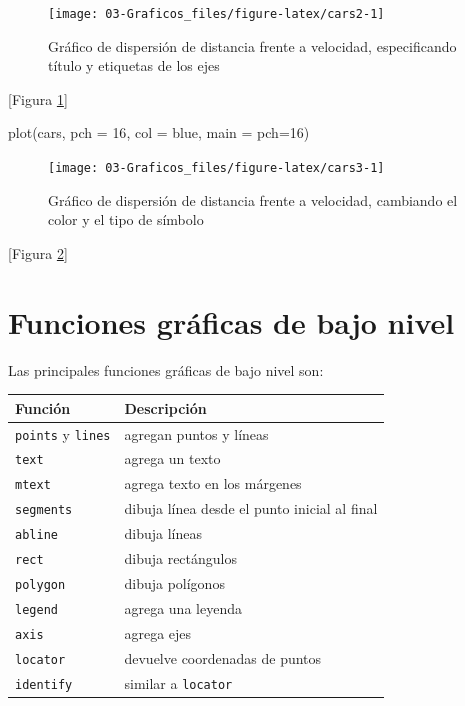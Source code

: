 \documentclass[
]{book}
\newenvironment{Shaded}{\begin{snugshade}}{\end{snugshade}}
\newcommand{\AttributeTok}[1]{\textcolor[rgb]{0.77,0.63,0.00}{#1}}
\newcommand{\DecValTok}[1]{\textcolor[rgb]{0.00,0.00,0.81}{#1}}
\newcommand{\FunctionTok}[1]{\textcolor[rgb]{0.00,0.00,0.00}{#1}}
\newcommand{\NormalTok}[1]{#1}
\newcommand{\StringTok}[1]{\textcolor[rgb]{0.31,0.60,0.02}{#1}}
\theoremstyle{break}
\theoremstyle{nonumberplain}
\begin{document}
\begin{figure}[!htb]

{\centering \texttt{[image: 03-Graficos\_files/figure-latex/cars2-1]} 

}

\caption{Gráfico de dispersión de distancia frente a velocidad, especificando título y etiquetas de los ejes}\label{fig:cars2}
\end{figure}

{[}Figura \ref{fig:cars2}{]}

\begin{Shaded}
\begin{Highlighting}[]
\FunctionTok{plot}\NormalTok{(cars, }\AttributeTok{pch =} \DecValTok{16}\NormalTok{, }\AttributeTok{col =} \StringTok{\textquotesingle{}blue\textquotesingle{}}\NormalTok{, }\AttributeTok{main =} \StringTok{\textquotesingle{}pch=16\textquotesingle{}}\NormalTok{)}
\end{Highlighting}
\end{Shaded}

\begin{figure}[!htb]

{\centering \texttt{[image: 03-Graficos\_files/figure-latex/cars3-1]} 

}

\caption{Gráfico de dispersión de distancia frente a velocidad, cambiando el color y el tipo de símbolo}\label{fig:cars3}
\end{figure}

{[}Figura \ref{fig:cars3}{]}

\hypertarget{funciones-gruxe1ficas-de-bajo-nivel}{%
\section{Funciones gráficas de bajo nivel}\label{funciones-gruxe1ficas-de-bajo-nivel}}

Las principales funciones gráficas de bajo nivel son:

\begin{longtable}[]{@{}ll@{}}
\toprule
Función & Descripción \\
\midrule
\endhead
\texttt{points} y \texttt{lines} & agregan puntos y líneas \\
\texttt{text} & agrega un texto \\
\texttt{mtext} & agrega texto en los márgenes \\
\texttt{segments} & dibuja línea desde el punto inicial al final \\
\texttt{abline} & dibuja líneas \\
\texttt{rect} & dibuja rectángulos \\
\texttt{polygon} & dibuja polígonos \\
\texttt{legend} & agrega una leyenda \\
\texttt{axis} & agrega ejes \\
\texttt{locator} & devuelve coordenadas de puntos \\
\texttt{identify} & similar a \texttt{locator} \\
\bottomrule
\end{longtable}
\end{document}

